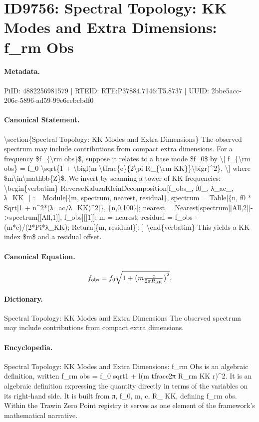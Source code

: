 \section*{ID9756: Spectral Topology: KK Modes and Extra Dimensions: f\_rm Obs}
\paragraph{Metadata.}
PiID: 4882256981579 | RTEID: RTE:P37884.7146:T5.8737 | UUID: 2bbe5acc-206c-5896-ad59-99e6eebcbdf0

\paragraph{Canonical Statement.}
\textbackslash{}section\{Spectral Topology: KK Modes and Extra Dimensions\} The observed spectrum may include contributions from compact extra dimensions. For a frequency \$f\_\{\textbackslash{}rm obs\}\$, suppose it relates to a base mode \$f\_0\$ by \textbackslash{}[ f\_\{\textbackslash{}rm obs\} = f\_0 \textbackslash{}sqrt\{1 + \textbackslash{}bigl(m \textbackslash{}tfrac\{c\}\{2\textbackslash{}pi R\_\{\textbackslash{}rm KK\}\}\textbackslash{}bigr)\textasciicircum{}2\}, \textbackslash{}] where \$m\textbackslash{}in\textbackslash{}mathbb\{Z\}\$. We invert by scanning a tower of KK frequencies: \textbackslash{}begin\{verbatim\} ReverseKaluzaKleinDecomposition[f\_obs\_, f0\_, λ\_ac\_, λ\_KK\_] := Module[\{m, spectrum, nearest, residual\}, spectrum = Table[\{n, f0 * Sqrt[1 + n\textasciicircum{}2*(λ\_ac/λ\_KK)\textasciicircum{}2]\}, \{n,0,100\}]; nearest = Nearest[spectrum[[All,2]]->spectrum[[All,1]], f\_obs][[1]]; m = nearest; residual = f\_obs - (m*c)/(2*Pi*λ\_KK); Return[\{m, residual\}]; ] \textbackslash{}end\{verbatim\} This yields a KK index \$m\$ and a residual offset.

\paragraph{Canonical Equation.}
\[
f_{\rm obs} = f_0 \sqrt{1 + \bigl(m \tfrac{c}{2\pi R_{\rm KK}}\bigr)^2},
\]

\paragraph{Dictionary.}
Spectral Topology: KK Modes and Extra Dimensions The observed spectrum may include contributions from compact extra dimensions.

\paragraph{Encyclopedia.}
Spectral Topology: KK Modes and Extra Dimensions: f\_rm Obs is an algebraic definition, written f\_rm obs = f\_0 sqrt1 + l(m tfracc2π R\_rm KK r)\textasciicircum{}2. It is an algebraic definition expressing the quantity directly in terms of the variables on its right-hand side. It is built from π, f\_0, m, c, R\_ KK, defining f\_rm obs. Within the Trawin Zero Point registry it serves as one element of the framework's mathematical narrative.
